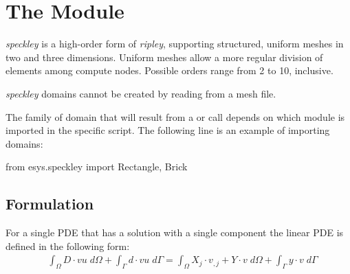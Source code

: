 
%
%
%

\chapter{The \speckley Module}\label{chap:speckley}

{\it speckley} is a high-order form of {\it ripley}, supporting structured, 
uniform meshes in two and three dimensions. Uniform meshes allow a more regular 
division of elements among compute nodes. Possible orders range from 2 to 10,
inclusive.

{\it speckley} domains cannot be created by reading from a mesh file.

The family of domain that will result from a 
 or  call depends on which module is imported in
the specific script. The following line is an example of importing 
\speckley domains:

\begin{python}
 from esys.speckley import Rectangle, Brick
\end{python}

\section{Formulation}
For a single PDE that has a solution with a single component the linear PDE is
defined in the following form:
\begin{equation}\label{SPECKLEY.SINGLE.1}
\begin{array}{cl} &
\displaystyle{
\int_{\Omega}
D \cdot vu \; d\Omega } + \int_{\Gamma} d \cdot vu \; d{\Gamma}

= \displaystyle{\int_{\Omega}  X_{j} \cdot v_{,j}+ Y \cdot v \; d\Omega }
+ \displaystyle{\int_{\Gamma} y \cdot v \; d{\Gamma}}
\end{array}
\end{equation}

